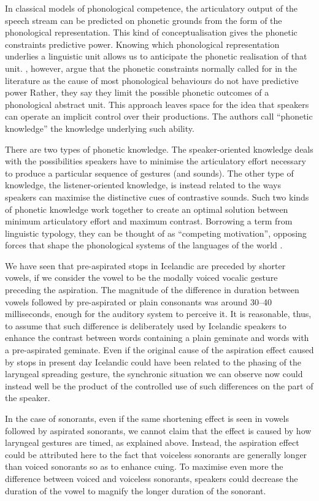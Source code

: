 \documentclass[11pt,a4paper,oneside,openany]{memoir}\usepackage[]{graphicx}\usepackage[]{color}
\begin{document}
In classical models of phonological competence, the articulatory output of the speech stream can be predicted on phonetic grounds from the form of the phonological representation.
This kind of conceptualisation gives the phonetic constraints predictive power.
Knowing which phonological representation underlies a linguistic unit allows us to anticipate the phonetic realisation of that unit. 
\citeauthor{kingston1994}, however, argue that the phonetic constraints normally called for in the literature as the cause of most phonological behaviours do not have predictive power
Rather, they say they limit the possible phonetic outcomes of a phonological abstract unit.
This approach leaves space for the idea that speakers can operate an implicit control over their productions.
The authors call ``phonetic knowledge'' the knowledge underlying such ability.

There are two types of phonetic knowledge.
The speaker-oriented knowledge deals with the possibilities speakers have to minimise the articulatory effort necessary to produce a particular sequence of gestures (and sounds).
The other type of knowledge, the listener-oriented knowledge, is instead related to the ways speakers can maximise the distinctive cues of contrastive sounds.
Such two kinds of phonetic knowledge work together to create an optimal solution between minimum articulatory effort and maximum contrast.
Borrowing a term from linguistic typology, they can be thought of as ``competing motivation'', opposing forces that shape the phonological systems of the languages of the world \citep{haiman1983,croft2002}.

We have seen that pre-aspirated stops in Icelandic are preceded by shorter vowels, if we consider the vowel to be the modally voiced vocalic gesture preceding the aspiration.
The magnitude of the difference in duration between vowels followed by pre-aspirated or plain consonants was around 30--40 milliseconds, enough for the auditory system to perceive it.
It is reasonable, thus, to assume that such difference is deliberately used by Icelandic speakers to enhance the contrast between words containing a plain geminate and words with a pre-aspirated geminate.
Even if the original cause of the aspiration effect caused by stops in present day Icelandic could have been related to the phasing of the laryngeal spreading gesture, the synchronic situation we can observe now could instead well be the product of the controlled use of such differences on the part of the speaker.

In the case of sonorants, even if the same shortening effect is seen in vowels followed by aspirated sonorants, we cannot claim that the effect is caused by how laryngeal gestures are timed, as explained above.
Instead, the aspiration effect could be attributed here to the fact that voiceless sonorants are generally longer than voiced sonorants so as to enhance cuing.
To maximise even more the difference between voiced and voiceless sonorants, speakers could decrease the duration of the vowel to magnify the longer duration of the sonorant.
\end{document}
